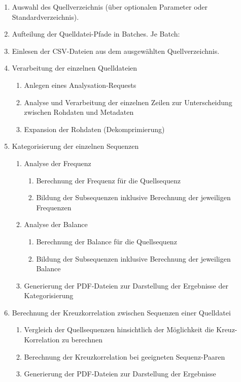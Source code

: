 \begin{enumerate}[nolistsep]
	\item Auswahl des Quellverzeichnis (über optionalen Parameter oder Standardverzeichnis).
	\item Aufteilung der Quelldatei-Pfade in Batches. Je Batch:
	\item Einlesen der CSV-Dateien aus dem ausgewählten Quellverzeichnis.
	\item Verarbeitung der einzelnen Quelldateien
	\begin{enumerate}[nolistsep]
		\item Anlegen eines Analysation-Requests
		\item Analyse und Verarbeitung der einzelnen Zeilen zur Unterscheidung zwischen Rohdaten und Metadaten
		\item Expansion der Rohdaten (Dekomprimierung)
	\end{enumerate}
	\item Kategorisierung der einzelnen Sequenzen
	\begin{enumerate}[nolistsep]
		\item Analyse der Frequenz
		\begin{enumerate}[nolistsep]
			\item Berechnung der Frequenz für die Quellsequenz
			\item Bildung der Subsequenzen inklusive Berechnung der jeweiligen Frequenzen
		\end{enumerate}
		\item Analyse der Balance
			\begin{enumerate}[nolistsep]
			\item Berechnung der Balance für die Quellsequenz
			\item Bildung der Subsequenzen inklusive Berechnung der jeweiligen Balance
		\end{enumerate}
		\item Generierung der PDF-Dateien zur Darstellung der Ergebnisse der Kategorisierung
	\end{enumerate}
	\item Berechnung der Kreuzkorrelation zwischen Sequenzen einer Quelldatei
	\begin{enumerate}[nolistsep]
		\item Vergleich der Quellsequenzen hinsichtlich der Möglichkeit die Kreuz-Korrelation zu berechnen
		\item Berechnung der Kreuzkorrelation bei geeigneten Sequenz-Paaren
		\item Generierung der PDF-Dateien zur Darstellung der Ergebnisse
	\end{enumerate}
\end{enumerate}


